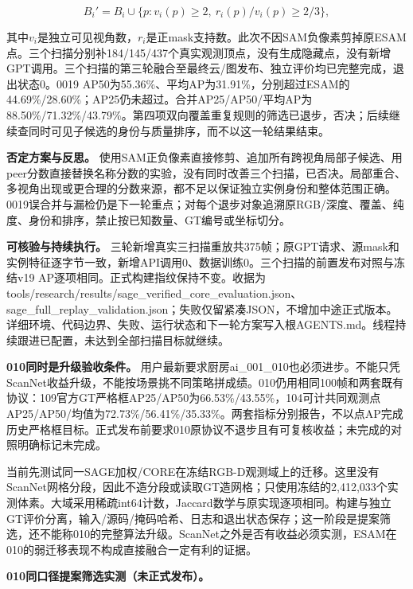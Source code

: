 \documentclass[UTF8,fontset=fandol]{ctexart}
\begin{document}
\[
B_i'=B_i\cup\{p:v_i(p)\ge2,\ r_i(p)/v_i(p)\ge2/3\},
\]

其中$v_i$是独立可见视角数，$r_i$是正mask支持数。此次不因SAM负像素剪掉原ESAM点。三个扫描分别补184/145/437个真实观测顶点，没有生成隐藏点，没有新增GPT调用。三个扫描的第三轮融合至最终云/图发布、独立评价均已完整完成，退出状态0。0019 AP50为55.36\%、平均AP为31.91\%，分别超过ESAM的44.69\%/28.60\%；AP25仍未超过。合并AP25/AP50/平均AP为88.50\%/71.32\%/43.79\%。第四项双向覆盖重复规则的筛选已退步，否决；后续继续查同时可见子候选的身份与质量排序，而不以这一轮结果结束。



\textbf{否定方案与反思。} 使用SAM正负像素直接修剪、追加所有跨视角局部子候选、用peer分数直接替换名称分数的实验，没有同时改善三个扫描，已否决。局部重合、多视角出现或更合理的分数来源，都不足以保证独立实例身份和整体范围正确。0019误合并与漏检仍是下一轮重点；对每个退步对象追溯原RGB/深度、覆盖、纯度、身份和排序，禁止按已知数量、GT编号或坐标切分。



\textbf{可核验与持续执行。} 三轮新增真实三扫描重放共375帧；原GPT请求、源mask和实例特征逐字节一致，新增API调用0、数据训练0。三个扫描的前置发布对照与冻结v19 AP逐项相同。正式构建指纹保持不变。收据为tools/research/results/sage\_verified\_core\_evaluation.json、sage\_full\_replay\_validation.json；失败仅留紧凑JSON，不增加中途正式版本。详细环境、代码边界、失败、运行状态和下一轮方案写入根AGENTS.md。线程持续跟进已配置，未达到全部扫描目标就继续。



\textbf{010同时是升级验收条件。} 用户最新要求厨房ai\_001\_010也必须进步。不能只凭ScanNet收益升级，不能按场景挑不同策略拼成绩。010仍用相同100帧和两套既有协议：109官方GT严格框AP25/AP50为66.53\%/43.55\%，104可计共同观测点AP25/AP50/均值为72.73\%/56.41\%/35.33\%。两套指标分别报告，不以点AP完成历史严格框目标。正式发布前要求010原协议不退步且有可复核收益；未完成的对照明确标记未完成。



当前先测试同一SAGE加权/CORE在冻结RGB-D观测域上的迁移。这里没有ScanNet网格分段，因此不造分段或读取GT造网格；只使用冻结的2,412,033个实测体素。大域采用稀疏int64计数，Jaccard数学与原实现逐项相同。构建与独立GT评价分离，输入/源码/掩码哈希、日志和退出状态保存；这一阶段是提案筛选，还不能称010的完整算法升级。ScanNet之外是否有收益必须实测，ESAM在010的弱迁移表现不构成直接融合一定有利的证据。



\textbf{010同口径提案筛选实测（未正式发布）。}
\end{document}
